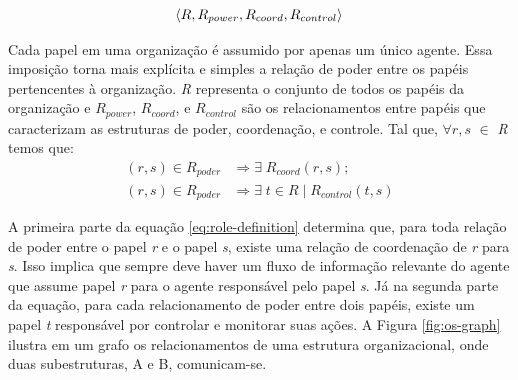         \begin{equation}
            \centering
            \label{eq:os-structure}
            \langle  R, R_{power}, R_{coord}, R_{control}  \rangle
        \end{equation}
        
        Cada papel em uma organização é assumido por apenas um único agente. Essa imposição torna mais explícita e simples a relação de poder entre os papéis pertencentes à organização. 
        \emph{R} representa o conjunto de todos os papéis da organização e $R_{power}$,  $R_{coord}$, e $R_{control}$ são os relacionamentos entre papéis que caracterizam as estruturas de poder, coordenação, e controle. Tal que, $\forall{r, s}$ $\in$ \emph{R} temos que:
        \begin{equation}
            \label{eq:role-definition}
            \begin{split}
                 (r, s)  \in R_{poder} &\Rightarrow \exists \; R_{coord}(r, s);\\
                 (r, s)  \in R_{poder} &\Rightarrow \exists \;  t \in R \; | \; R_{control}(t, s)
            \end{split}
        \end{equation}
        
        A primeira parte da equação \ref{eq:role-definition} determina que, para toda relação de poder entre o papel \emph{r} e o papel \emph{s}, existe uma relação de coordenação de \emph{r} para \emph{s}. Isso implica que sempre deve haver um fluxo de informação relevante do agente que assume papel \emph{r} para o agente responsável pelo papel \emph{s}. Já na segunda parte da equação, para cada relacionamento de poder entre dois papéis, existe um papel \emph{t} responsável por controlar e monitorar suas ações. A Figura \ref{fig:os-graph} ilustra em um grafo os relacionamentos de uma estrutura organizacional, onde duas subestruturas, A e B, comunicam-se. 
        
        \clearpage
        \begin{figure}[h!]
            \centering
        \end{figure}
  
